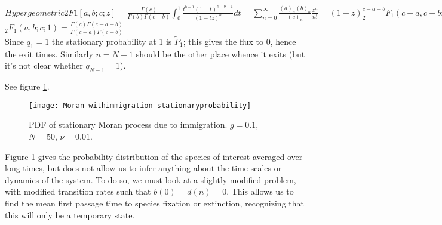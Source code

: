 $Hypergeometric2F1[a,b;c;z] = \frac{\Gamma(c)}{\Gamma(b)\Gamma(c-b)} \int_0^1 \frac{t^{b-1}(1-t)^{c-b-1}}{(1-t z)^{a}}dt = \sum_{n=0}^\infty \frac{(a)_n (b)_n}{(c)_n}\frac{z^n}{n!} = (1-z)^{c-a-b} _{2}F_1(c-a,c-b;c;z)$ \\
$_2F_1(a,b;c;1) = \frac{\Gamma(c)\Gamma(c-a-b)}{\Gamma(c-a)\Gamma(c-b)}$ \\
Since $q_1=1$ the stationary probability at 1 is $\widetilde{P}_1$; this gives the flux to 0, hence the exit times. 
Similarly $n=N-1$ should be the other place whence it exits (but it's not clear whether $q_{N-1}=1$). 





See figure \ref{stationary-fig}. 
\begin{figure}[ht]
	\centering
	\texttt{[image: Moran-withimmigration-stationaryprobability]}
	\caption{PDF of stationary Moran process due to immigration. $g=0.1$, $N=50$, $\nu=0.01$. } \label{stationary-fig}
\end{figure}

Figure \ref{stationary-fig} gives the probability distribution of the species of interest averaged over long times, but does not allow us to infer anything about the time scales or dynamics of the system. 
To do so, we must look at a slightly modified problem, with modified transition rates such that $b(0)=d(n)=0$. 
This allows us to find the mean first passage time to species fixation or extinction, recognizing that this will only be a temporary state. 

